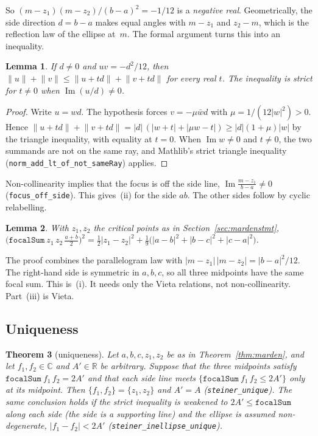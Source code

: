 \documentclass[11pt]{article}
\newtheorem{theorem}{Theorem}
\newtheorem{lemma}[theorem]{Lemma}
\theoremstyle{remark}
\newcommand{\lean}[1]{\texttt{#1}}
\newcommand{\nm}[1]{\lVert #1\rVert}
\newcommand{\R}{\mathbb{R}}
\newcommand{\C}{\mathbb{C}}
\begin{document}
So $(m-z_1)(m-z_2)/(b-a)^2=-1/12$ is a \emph{negative real}. Geometrically, the side direction
$d=b-a$ makes equal angles with $m-z_1$ and $z_2-m$, which is the reflection law of the ellipse at~$m$.
The formal argument turns this into an inequality.

\begin{lemma}\label{lem:reflect}
If $d\ne0$ and $uv=-d^2/12$, then $\nm u+\nm v\le\nm{u+td}+\nm{v+td}$ for every real $t$. The
inequality is strict for $t\ne0$ when $\operatorname{Im}(u/d)\ne0$.
\end{lemma}
\begin{proof}
Write $u=wd$. The hypothesis forces $v=-\mu\bar w d$ with $\mu=1/(12|w|^2)>0$. Hence
$\nm{u+td}+\nm{v+td}=|d|\,(|w+t|+|\mu w-t|)\ge|d|(1+\mu)|w|$ by the triangle inequality, with
equality at $t=0$. When $\operatorname{Im}w\ne0$ and $t\ne0$, the two summands are not on the same ray,
and Mathlib's strict triangle inequality (\lean{norm\_add\_lt\_of\_not\_sameRay}) applies.
\end{proof}

Non-collinearity implies that the focus is off the side line, $\operatorname{Im}\frac{m-z_1}{b-a}\ne0$
(\lean{focus\_off\_side}). This gives~(ii) for the side $ab$. The other sides follow by cyclic
relabelling.

\begin{lemma}\label{lem:focsq}
With $z_1,z_2$ the critical points as in Section~\ref{sec:mardenstmt},
$\bigl(\lean{focalSum}\ z_1\,z_2\,\frac{a+b}2\bigr)^{2}=\frac12|z_1-z_2|^2+\frac19\bigl(|a-b|^2+|b-c|^2+|c-a|^2\bigr)$.
\end{lemma}

The proof combines the parallelogram law with $|m-z_1|\,|m-z_2|=|b-a|^2/12$. The right-hand side
is symmetric in $a,b,c$, so all three midpoints have the same focal sum. This is~(i). It needs only the
Vieta relations, not non-collinearity. Part~(iii) is Vieta.

\subsection{Uniqueness}\label{sec:unique}

\begin{theorem}[uniqueness]\label{thm:unique}
Let $a,b,c,z_1,z_2$ be as in Theorem~\ref{thm:marden}, and let $f_1,f_2\in\C$ and $A'\in\R$ be
arbitrary. Suppose that the three midpoints satisfy $\lean{focalSum}\ f_1\,f_2=2A'$ and that
each side line meets $\{\lean{focalSum}\ f_1\,f_2\le2A'\}$ only at its midpoint. Then
$\{f_1,f_2\}=\{z_1,z_2\}$ and $A'=A$ (\lean{steiner\_unique}). The same conclusion holds if the
strict inequality is weakened to $2A'\le\lean{focalSum}$ along each side (the side is a
supporting line) and the ellipse is assumed non-degenerate, $|f_1-f_2|<2A'$
(\lean{steiner\_inellipse\_unique}).
\end{theorem}
\end{document}
